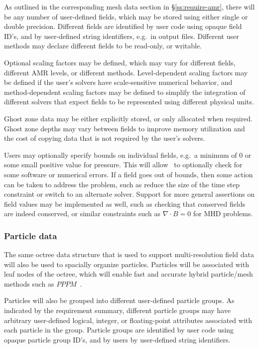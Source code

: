\documentclass[10pt,twocolumn]{article}
\begin{document}
As outlined in the corresponding mesh data section in
\S\ref{ss:require-amr}, there will be any number of user-defined
fields, which may be stored using either single or double precision.
Different fields are identified by user code using opaque field ID's,
and by user-defined string identifiers, e.g.~in output files.
Different user methods may declare different fields to be read-only,
or writable.

Optional scaling factors may be defined, which may vary for different
fields, different AMR levels, or different methods.  Level-dependent
scaling factors may be defined if the user's solvers have
scale-sensitive numerical behavior, and method-dependent scaling
factors may be defined to simplify the integration of different
solvers that expect fields to be represented using different physical
units.

Ghost zone data may be either explicitly stored, or only allocated
when required.  Ghost zone depths may vary between fields to improve
memory utilization and the cost of copying data that is not required
by the user's solvers.  

Users may optionally specify bounds on individual fields, e.g.~a
minimum of $0$ or some small positive value for pressure.  This will
allow \cello\ to optionally check for some software or numerical
errors.  If a field goes out of bounds, then some action can be taken
to address the problem, such as reduce the size of the time step
constraint or switch to an alternate solver.  Support for more general
assertions on field values may be implemented as well, such as
checking that conserved fields are indeed conserved, or similar
constraints such as $\nabla\cdot B=0$ for MHD problems.

\subsubsection{Particle data} \label{sss:design-particles}

The same octree data structure that is used to support
multi-resolution field data will also be used to spacially organize
particles.  Particles will be associated with leaf nodes of the
octree, which will enable fast and accurate hybrid particle/mesh
methods such as $PPPM$~\cite{HoEa88}.

Particles will also be grouped into different user-defined particle
groups.  As indicated by the requirement summary, different particle
groups may have arbitrary user-defined logical, integer, or
floating-point attributes associated with each particle in the group.
Particle groups are identified by user code using opaque particle
group ID's, and by users by user-defined string identifiers.
\end{document}
